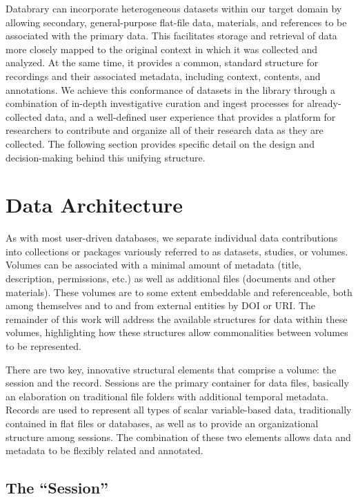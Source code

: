\documentclass{sig-alternate}
\begin{document}
Databrary can incorporate heterogeneous datasets within our target domain by allowing secondary, general-purpose flat-file data, materials, and references to be associated with the primary data.
This facilitates storage and retrieval of data more closely mapped to the original context in which it was collected and analyzed.
At the same time, it provides a common, standard structure for recordings and their associated metadata, including context, contents, and annotations.
We achieve this conformance of datasets in the library through a combination of in-depth investigative curation and ingest processes for already-collected data, and a well-defined user experience that provides a platform for researchers to contribute and organize all of their research data as they are collected.
The following section provides specific detail on the design and decision-making behind this unifying structure.

\section{Data Architecture}


As with most user-driven databases, we separate individual data contributions into collections or packages variously referred to as datasets, studies, or volumes.
Volumes can be associated with a minimal amount of metadata (title, description, permissions, etc.) as well as additional files (documents and other materials).
These volumes are to some extent embeddable and referenceable, both among themselves and to and from external entities by DOI or URI.
The remainder of this work will address the available structures for data within these volumes, highlighting how these structures allow commonalities between volumes to be represented.

There are two key, innovative structural elements that comprise a volume: the session and the record.
Sessions are the primary container for data files, basically an elaboration on traditional file folders with additional temporal metadata.
Records are used to represent all types of scalar variable-based data, traditionally contained in flat files or databases, as well as to provide an organizational structure among sessions.
The combination of these two elements allows data and metadata to be flexibly related and annotated.

\subsection{The ``Session''}
\end{document}
